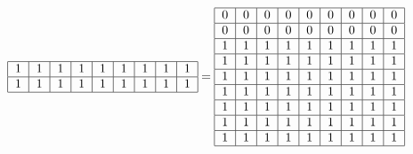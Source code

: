 \documentclass{article}
\begin{document}
\begin{equation}
\begin{tabular}{ | c | c | c | c | c | c | c | c | c | }
        \hline
        1 & 1 & 1 & 1 & 1 & 1 & 1 & 1 & 1 \\ 
        \hline
        1 & 1 & 1 & 1 & 1 & 1 & 1 & 1 & 1 \\ 
        \hline
    \end{tabular} = 
    \begin{tabular}{ | c | c | c | c | c | c | c | c | c | }
        \hline
        0 & 0 & 0 & 0 & 0 & 0 & 0 & 0 & 0 \\ 
        \hline
        0 & 0 & 0 & 0 & 0 & 0 & 0 & 0 & 0 \\ 
        \hline
        1 & 1 & 1 & 1 & 1 & 1 & 1 & 1 & 1 \\ 
        \hline
        1 & 1 & 1 & 1 & 1 & 1 & 1 & 1 & 1 \\ 
        \hline
        1 & 1 & 1 & 1 & 1 & 1 & 1 & 1 & 1 \\ 
        \hline
        1 & 1 & 1 & 1 & 1 & 1 & 1 & 1 & 1 \\ 
        \hline
        1 & 1 & 1 & 1 & 1 & 1 & 1 & 1 & 1 \\ 
        \hline
        1 & 1 & 1 & 1 & 1 & 1 & 1 & 1 & 1 \\ 
        \hline
        1 & 1 & 1 & 1 & 1 & 1 & 1 & 1 & 1 \\ 
        \hline
    \end{tabular}
\end{equation}
\end{document}

